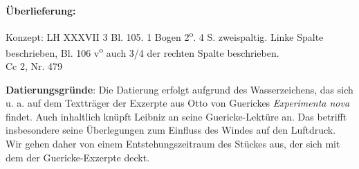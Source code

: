       
               
                \begin{ledgroupsized}[r]{120mm}
                \footnotesize 
                \pstart                
                \noindent\textbf{\"{U}berlieferung:}   
                \pend
                \end{ledgroupsized}
            
              
                            \begin{ledgroupsized}[r]{114mm}
                            \footnotesize 
                            \pstart \parindent -6mm
                            Konzept: LH XXXVII 3 Bl. 105. 1 Bogen 2\textsuperscript{o}. 4 S. zweispaltig. Linke Spalte beschrieben, Bl. 106 v\textsuperscript{o} auch 3/4 der rechten Spalte beschrieben.\\
 Cc 2, Nr. 479 \pend
                            \end{ledgroupsized}
                \vspace*{5mm}
                \begin{ledgroup}
                \footnotesize 
                \pstart
            \noindent\footnotesize{\textbf{Datierungsgr\"{u}nde}: Die Datierung erfolgt aufgrund des Wasserzeichens, das sich u. a. auf dem Texttr\"{a}ger der Exzerpte aus Otto von Guerickes \cite{00055}\textit{Experimenta nova} findet. Auch inhaltlich kn\"{u}pft Leibniz an seine Guericke-Lekt\"{u}re an. Das betrifft insbesondere seine \"{U}berlegungen zum Einfluss des Windes auf den Luftdruck. Wir gehen daher von einem Entstehungszeitraum des St\"{u}ckes aus, der sich mit dem der Guericke-Exzerpte deckt.}
                \pend
                \end{ledgroup}
            
